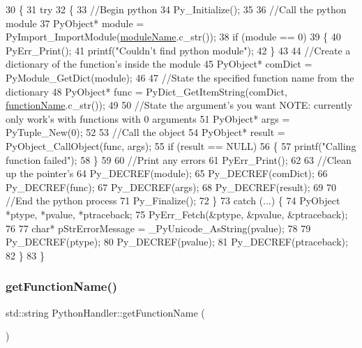 \begin{DoxyCode}
30 \{
31     \textcolor{keywordflow}{try}
32     \{
33         \textcolor{comment}{//Begin python}
34         Py\_Initialize();
35 
36         \textcolor{comment}{//Call the python module}
37         PyObject* module = PyImport\_ImportModule(\hyperlink{class_python_handler_ae29ce86e7c2dce2340caa90ba1d6ac72}{moduleName}.c\_str());
38         \textcolor{keywordflow}{if} (module == 0)
39         \{
40             PyErr\_Print();
41             printf(\textcolor{stringliteral}{"Couldn't find python module"});
42         \}
43 
44         \textcolor{comment}{//Create a dictionary of the function's inside the module}
45         PyObject* comDict = PyModule\_GetDict(module);
46 
47         \textcolor{comment}{//State the specified function name from the dictionary}
48         PyObject* func = PyDict\_GetItemString(comDict, \hyperlink{class_python_handler_a5946996068756c245e023cfe7e77f034}{functionName}.c\_str());
49 
50         \textcolor{comment}{//State the argument's you want NOTE: currently only work's with functions with 0 arguments}
51         PyObject* args = PyTuple\_New(0);
52 
53         \textcolor{comment}{//Call the object}
54         PyObject* result = PyObject\_CallObject(func, args);
55         \textcolor{keywordflow}{if} (result == NULL)
56         \{
57             printf(\textcolor{stringliteral}{"Calling function failed"});
58         \}
59 
60         \textcolor{comment}{//Print any errors}
61         PyErr\_Print();
62 
63         \textcolor{comment}{//Clean up the pointer's}
64         Py\_DECREF(module);
65         Py\_DECREF(comDict);
66         Py\_DECREF(func);
67         Py\_DECREF(args);
68         Py\_DECREF(result);
69 
70         \textcolor{comment}{//End the python process}
71         Py\_Finalize();
72     \}
73     \textcolor{keywordflow}{catch} (...) \{
74         PyObject *ptype, *pvalue, *ptraceback;
75         PyErr\_Fetch(&ptype, &pvalue, &ptraceback);
76 
77         \textcolor{keywordtype}{char}* pStrErrorMessage = \_PyUnicode\_AsString(pvalue);
78 
79         Py\_DECREF(ptype);
80         Py\_DECREF(pvalue);
81         Py\_DECREF(ptraceback);
82     \}
83 \}
\end{DoxyCode}
\mbox{\label{class_python_handler_a60186d0ff375491ad5d91c7448c29288}} 
\subsubsection{\texorpdfstring{get\+Function\+Name()}{getFunctionName()}}
{\footnotesize\ttfamily std\+::string Python\+Handler\+::get\+Function\+Name (\begin{DoxyParamCaption}{ }\end{DoxyParamCaption})}



